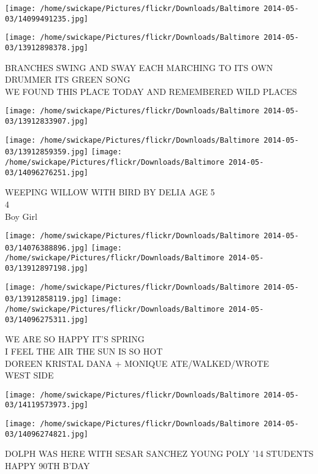 \documentclass[10pt,letterpaper]{article}
\begin{document}
\texttt{[image: /home/swickape/Pictures/flickr/Downloads/Baltimore 2014-05-03/14099491235.jpg]}

\vspace{0.25in}
\texttt{[image: /home/swickape/Pictures/flickr/Downloads/Baltimore 2014-05-03/13912898378.jpg]}

BRANCHES SWING AND SWAY EACH MARCHING TO ITS OWN DRUMMER ITS GREEN SONG\\
WE FOUND THIS PLACE TODAY AND REMEMBERED WILD PLACES
\pagebreak

\texttt{[image: /home/swickape/Pictures/flickr/Downloads/Baltimore 2014-05-03/13912833907.jpg]}

\vspace{0.25in}
\texttt{[image: /home/swickape/Pictures/flickr/Downloads/Baltimore 2014-05-03/13912859359.jpg]}
\texttt{[image: /home/swickape/Pictures/flickr/Downloads/Baltimore 2014-05-03/14096276251.jpg]}

WEEPING WILLOW WITH BIRD BY DELIA AGE 5\\
4\\
Boy Girl
\pagebreak

\texttt{[image: /home/swickape/Pictures/flickr/Downloads/Baltimore 2014-05-03/14076388896.jpg]}
\texttt{[image: /home/swickape/Pictures/flickr/Downloads/Baltimore 2014-05-03/13912897198.jpg]}

\texttt{[image: /home/swickape/Pictures/flickr/Downloads/Baltimore 2014-05-03/13912858119.jpg]}
\texttt{[image: /home/swickape/Pictures/flickr/Downloads/Baltimore 2014-05-03/14096275311.jpg]}

WE ARE SO HAPPY IT'S SPRING\\
I FEEL THE AIR THE SUN IS SO HOT\\
DOREEN KRISTAL DANA + MONIQUE ATE/WALKED/WROTE\\
WEST SIDE
\pagebreak

\texttt{[image: /home/swickape/Pictures/flickr/Downloads/Baltimore 2014-05-03/14119573973.jpg]}

\vspace{0.25in}
\texttt{[image: /home/swickape/Pictures/flickr/Downloads/Baltimore 2014-05-03/14096274821.jpg]}

DOLPH WAS HERE WITH SESAR SANCHEZ YOUNG POLY '14 STUDENTS\\
HAPPY 90TH B'DAY
\pagebreak
\end{document}
